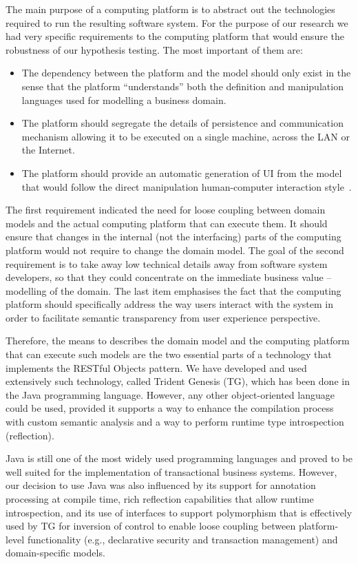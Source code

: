 \documentclass[a4paper,12pt,oneside,openright,final]{memoir} %
\begin{document}
  The main purpose of a computing platform is to abstract out the technologies required to run the resulting software system.
  For the purpose of our research we had very specific requirements to the computing platform that would ensure the robustness of our hypothesis testing.
  The most important of them are:
  \begin{itemize}
    \item The dependency between the platform and the model should only exist in the sense that the platform ``understands'' both the definition and manipulation languages used for modelling a business domain.
    \item The platform should segregate the details of persistence and communication mechanism allowing it to be executed on a single machine, across the LAN or the Internet.
    \item The platform should provide an automatic generation of UI from the model that would follow the direct manipulation human-computer interaction style~\cite{shneiderman1982, shneiderman1983}.
  \end{itemize}

  The first requirement indicated the need for loose coupling between domain models and the actual computing platform that can execute them.
  It should ensure that changes in the internal (not the interfacing) parts of the computing platform would not require to change the domain model.
  The goal of the second requirement is to take away low technical details away from software system developers, so that they could concentrate on the immediate business value -- modelling of the domain.
  The last item emphasises the fact that the computing platform should specifically address the way users interact with the system in order to facilitate semantic transparency from user experience perspective.

  Therefore, the means to describes the domain model and the computing platform that can execute such models are the two essential parts of a technology that implements the RESTful Objects pattern.
  We have developed and used extensively such technology, called Trident Genesis (TG), which has been done in the Java programming language.
  However, any other object-oriented language could be used, provided it supports a way to enhance the compilation process with custom semantic analysis and a way to perform runtime type introspection (reflection).
  
  Java is still one of the most widely used programming languages and proved to be well suited for the implementation of transactional business systems.
  However, our decision to use Java was also influenced by its support for annotation processing at compile time, rich reflection capabilities that allow runtime introspection, and its use of interfaces to support polymorphism that is effectively used by TG for inversion of control to enable loose coupling between platform-level functionality (e.g., declarative security and transaction management) and domain-specific models.
\end{document}
